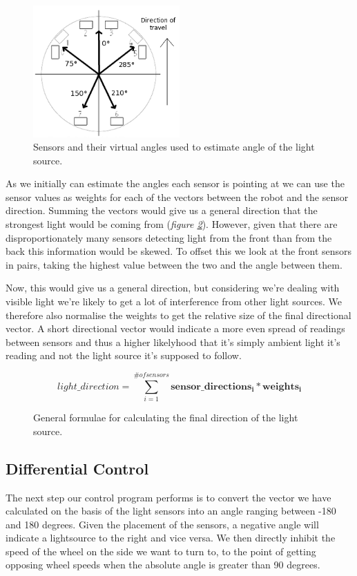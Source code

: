 \documentclass[paper=a4, fontsize=12pt]{scrartcl}	%
\numberwithin{equation}{section}		%
\numberwithin{figure}{section}			%
\numberwithin{table}{section}				%
\begin{document}
\begin{figure}[!ht]
 \centering
  \includegraphics[width=0.5\textwidth]{IRSensors2}
  \caption{Sensors and their virtual angles used to estimate angle of the light source.}
\label{fig:img_sensors}
\end{figure}

As we initially can estimate the angles each sensor is pointing at we can use the sensor values as weights for each of the vectors between the robot and the sensor direction. Summing the vectors would give us a general direction that the strongest light would be coming from (\emph{figure \ref{fig:dir_formula}}). However, given that there are disproportionately many sensors detecting light from the front than from the back this information would be skewed. To offset this we look at the front sensors in pairs, taking the highest value between the two and the angle between them.

Now, this would give us a general direction, but considering we're dealing with visible light we're likely to get a lot of interference from other light sources. We therefore also normalise the weights to get the relative size of the final directional vector. A short directional vector would indicate a more even spread of readings between sensors and thus a higher likelyhood that it's simply ambient light it's reading and not the light source it's supposed to follow.

\begin{figure}[!ht]
\[
  light\_direction = \sum_{i=1}^{\# of sensors} \mathbf{sensor\_directions_i}*\mathbf{weights_i}
\]
\caption{General formulae for calculating the final direction of the light source.}
\label{fig:dir_formula}
\end{figure}

\pagebreak
\subsection{Differential Control}
The next step our control program performs is to convert the vector we have calculated on the basis of the light sensors into an angle ranging between -180 and 180 degrees. Given the placement of the sensors, a negative angle will indicate a lightsource to the right and vice versa. We then directly inhibit the speed of the wheel on the side we want to turn to, to the point of getting opposing wheel speeds when the absolute angle is greater than 90 degrees.
\end{document}
